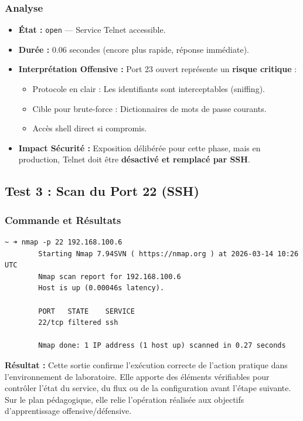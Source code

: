 \documentclass[12pt,a4paper,openany]{report}
\begin{document}
	\subsubsection{Analyse}
	\begin{itemize}
		\item \textbf{État :} \texttt{open} --- Service Telnet accessible.
		\item \textbf{Durée :} 0.06 secondes (encore plus rapide, réponse immédiate).
		\item \textbf{Interprétation Offensive :} Port 23 ouvert représente un \textbf{risque critique} :
		\begin{itemize}
			\item Protocole en clair : Les identifiants sont interceptables (sniffing).
			\item Cible pour brute-force : Dictionnaires de mots de passe courants.
			\item Accès shell direct si compromis.
		\end{itemize}
		\item \textbf{Impact Sécurité :} Exposition délibérée pour cette phase, mais en production, Telnet doit être \textbf{désactivé et remplacé par SSH}.
	\end{itemize}
	
	\subsection{Test 3 : Scan du Port 22 (SSH)}
	\subsubsection{Commande et Résultats}
	\begin{lstlisting}[caption=Scan Nmap du port SSH (non forwardé)]
		~ ➜ nmap -p 22 192.168.100.6
		Starting Nmap 7.94SVN ( https://nmap.org ) at 2026-03-14 10:26 UTC
		Nmap scan report for 192.168.100.6
		Host is up (0.00046s latency).
		
		PORT   STATE    SERVICE
		22/tcp filtered ssh
		
		Nmap done: 1 IP address (1 host up) scanned in 0.27 seconds
	\end{lstlisting}
	
	\textbf{Résultat :} Cette sortie confirme l'exécution correcte de l'action pratique dans l'environnement de laboratoire. Elle apporte des éléments vérifiables pour contrôler l'état du service, du flux ou de la configuration avant l'étape suivante. Sur le plan pédagogique, elle relie l'opération réalisée aux objectifs d'apprentissage offensive/défensive.
	
\end{document}
